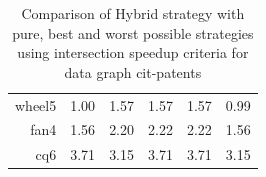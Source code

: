 {\begin{table}[]
\begin{tabular}{r|ccccc}
        wheel5         & 1.00                & 1.57                & 1.57            & 1.57          & 0.99           \\
        fan4           & 1.56                & 2.20                & 2.22            & 2.22          & 1.56           \\
        cq6            & 3.71                & 3.15                & 3.71            & 3.71          & 3.15           \\
    \end{tabular}%
    \caption{Comparison of Hybrid strategy with pure, best and worst possible strategies using intersection speedup criteria for data graph cit-patents}
    \label{tab:hybrid-symbreak-performance}
\end{table}


\begin{table}[]
    \centering
\end{table}}
